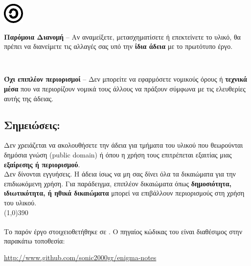 \vspace{1em}
\noindent
\parbox{1.5cm}{\includegraphics[scale=1.5]{images/license/cc_sa_30}}
\parbox{10.5cm}{\textbf{Παρόμοια Διανομή}  -- Αν αναμείξετε, μετασχηματίσετε ή επεκτείνετε το υλικό, θα πρέπει να διανείμετε τις αλλαγές σας υπό την \textbf{ίδια άδεια} με το πρωτότυπο έργο.}

\vspace{1em}
\noindent
\parbox{1.5cm}{\ }
\parbox{10.5cm}{\textbf{Όχι επιπλέον περιορισμοί} -- Δεν μπορείτε να εφαρμόσετε νομικούς όρους ή \textbf{τεχνικά μέσα} που να περιορίζουν νομικά τους άλλους να πράξουν σύμφωνα με τις ελευθερίες αυτής της άδειας.}
\subsection*{Σημειώσεις:}
\noindent
Δεν χρειάζεται να ακολουθήσετε την άδεια για τμήματα του υλικού που θεωρούνται δημόσια γνώση (public domain) ή όπου η χρήση τους επιτρέπεται εξαιτίας μιας \textbf{εξαίρεσης ή περιορισμού}.\\

\noindent
Δεν δίνονται εγγυήσεις. Η άδεια ίσως να μη σας δίνει όλα τα δικαιώματα για την επιδιωκόμενη χρήση. Για παράδειγμα, επιπλέον δικαιώματα όπως \textbf{δημοσιότητα, ιδιωτικότητα, ή ηθικά δικαιώματα} μπορεί να επιβάλλουν περιορισμούς στη χρήση του υλικού.\\
\line(1,0){390}\\\\
\noindent
Το παρόν έργο στοιχειοθετήθηκε σε \XeLaTeX. Ο πηγαίος κώδικας του είναι διαθέσιμος στην παρακάτω τοποθεσία:
\begin{center}
\url{http://www.github.com/sonic2000gr/enigma-notes}
\end{center}
\newpage
\tableofcontents
\newpage

